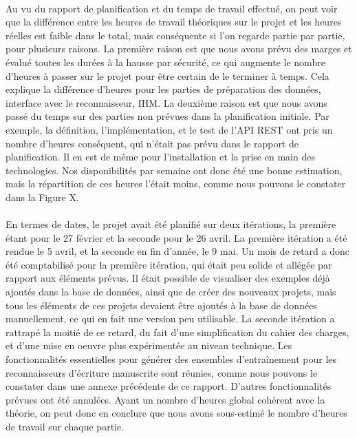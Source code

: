 \paragraph{}
Au vu du rapport de planification et du temps de travail effectué, on peut voir que la différence entre les heures de travail théoriques sur le projet et les heures réelles est faible dans le total, mais conséquente si l'on regarde partie par partie, pour plusieurs raisons. La première raison est que nous avons prévu des marges et évalué toutes les durées à la hausse par sécurité, ce qui augmente le nombre d'heures à passer sur le projet pour être certain de le terminer à temps. Cela explique la différence d'heures pour les parties de préparation des données, interface avec le reconnaisseur, IHM. La deuxième raison est que nous avons passé du temps sur des parties non prévues dans la planification initiale. Par exemple, la définition, l'implémentation, et le test de l'API REST ont pris un nombre d'heures conséquent, qui n'était pas prévu dans le rapport de planification. Il en est de même pour l'installation et la prise en main des technologies. Nos disponibilités par semaine ont donc été une bonne estimation, mais la répartition de ces heures l'était moins, comme nous pouvons le constater dans la Figure X.

\paragraph{}
En termes de dates, le projet avait été planifié sur deux itérations, la première étant pour le 27 février et la seconde pour le 26 avril. La première itération a été rendue le 5 avril, et la seconde en fin d'année, le 9 mai. Un mois de retard a donc été comptabilisé pour la première itération, qui était peu solide et allégée par rapport aux éléments prévus. Il était possible de visualiser des exemples déjà ajoutés dans la base de données, ainsi que de créer des nouveaux projets, mais tous les éléments de ces projets devaient être ajoutés à la base de données manuellement, ce qui en fait une version peu utilisable. La seconde itération a rattrapé la moitié de ce retard, du fait d'une simplification du cahier des charges, et d'une mise en oeuvre plus expérimentée au niveau technique. Les fonctionnalités essentielles pour générer des ensembles d'entraînement pour les reconnaisseurs d'écriture manuscrite sont réunies, comme nous pouvons le constater dans une annexe précédente de ce rapport. D'autres fonctionnalités prévues ont été annulées. Ayant un nombre d'heures global cohérent avec la théorie, on peut donc en conclure que nous avons sous-estimé le nombre d'heures de travail sur chaque partie.

